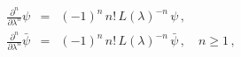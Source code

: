 \begin{equation}\label{eq:local--nonlocal}
\begin{array}{rcl}
\frac{\partial^n}{\partial \lambda^{n}} \psi
&=&(-1)^n\,n!\,L(\lambda)^{-n}\,\psi\,,\\
\frac{\partial^n}{\partial \lambda^{n}} \bar{\psi}
&=&(-1)^n\,n!\,L(\lambda)^{-n}\,\bar{\psi}\,,\quad n\geq 1\,,
\end{array}
\end{equation}

